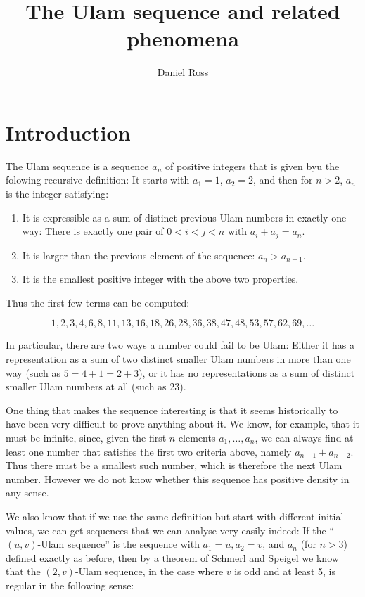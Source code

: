 \documentclass{article}
\title{The Ulam sequence and related phenomena}
\author{Daniel Ross}
\date{ }
\theoremstyle{definition}
\theoremstyle{remark}
\numberwithin{equation}{section}
\begin{document}
\maketitle

\tableofcontents

\section{Introduction}

The Ulam sequence is a sequence $a_n$ of positive integers that is given byu
the folowing recursive definition: It starts with $a_1 = 1$,
$a_2 = 2$, and then for $n > 2$, $a_n$ is the integer satisfying:
\begin{enumerate}
\item It is expressible as a sum of distinct previous Ulam numbers in
  exactly one way: There is exactly one pair of $0 < i < j < n$ with
  $a_i + a_j = a_n$.
\item It is larger than the previous element of the sequence: $a_n >
  a_{n-1}$.
\item It is the smallest positive integer with the above two
  properties.
\end{enumerate}

Thus the first few terms can be computed: 

\[1, 2, 3, 4, 6, 8, 11, 13, 16, 18, 26, 28, 36, 38, 47, 48, 53, 57, 62,
69, \ldots\]

In particular, there are two ways a number could fail to be Ulam:
Either it has a representation as a sum of two distinct smaller Ulam
numbers in more than one way (such as $5 = 4+1 = 2+3$), or it has no
representations as a sum of distinct smaller Ulam numbers at all (such
as 23).

One thing that makes the sequence interesting is that it seems
historically to have been very difficult to prove anything about it.
We know, for example, that it must be infinite, since, given the first
$n$ elements $a_1, \ldots, a_n$, we can always find at least one
number that satisfies the first two criteria above, namely
$a_{n-1} + a_{n-2}$.  Thus there must be a smallest such number, which
is therefore the next Ulam number.  However we do not know whether
this sequence has positive density in any sense.

We also know that if we use the same definition but start with
different initial values, we can get sequences that we can analyse
very easily indeed: If the ``$(u,v)$-Ulam sequence'' is the sequence
with $a_1 = u, a_2 = v$, and $a_n$ (for $n > 3$) defined exactly as
before, then by a theorem of Schmerl and Speigel
\cite{schmerl:jct1994} we know that the $(2,v)$-Ulam sequence, in the
case where $v$ is odd and at least 5, is regular in the following
sense:
\end{document}

